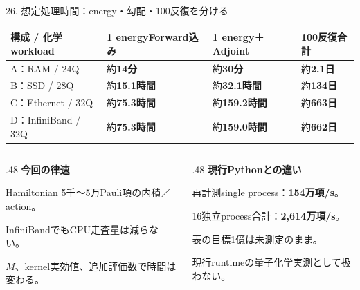 \begin{frame}{26. 想定処理時間：energy・勾配・100反復を分ける}
  \small
  \begin{tabularx}{\textwidth}{@{}p{}XXX@{}}
    \toprule 構成 / 化学workload & 1 energy\newline Forward込み & 1 energy＋Adjoint & 100反復合計 \\
    \midrule
    A：RAM / 24Q & 約\textbf{14分} & 約\textbf{30分} & 約\textbf{2.1日} \\
    B：SSD / 28Q & 約\textbf{15.1時間} & 約\textbf{32.1時間} & 約\textbf{134日} \\
    C：Ethernet / 32Q & 約\textbf{75.3時間} & 約\textbf{159.2時間} & 約\textbf{663日} \\
    D：InfiniBand / 32Q & 約\textbf{75.3時間} & 約\textbf{159.0時間} & 約\textbf{662日} \\
    \bottomrule
  \end{tabularx}
  \medskip
  \begin{columns}[T,onlytextwidth]
    \begin{column}{.48\textwidth}
      \textbf{今回の律速}\par
      \small Hamiltonian 5千〜5万Pauli項の内積／action。\par
      InfiniBandでもCPU走査量は減らない。\par
      $M$、kernel実効値、追加評価数で時間は変わる。
    \end{column}
    \begin{column}{.48\textwidth}
      \textbf{現行Pythonとの違い}\par
      \small 再計測single process：\textbf{154万項/s}。\par
      16独立process合計：\textbf{2,614万項/s}。\par
      表の目標1億は未測定のまま。\par
      現行runtimeの量子化学実測として扱わない。
    \end{column}
  \end{columns}
\end{frame}
